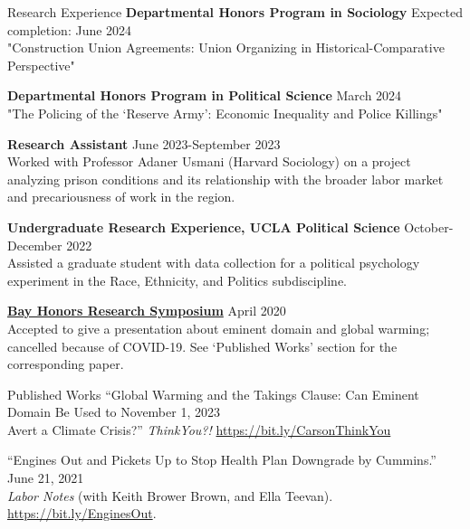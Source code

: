 \documentclass[
	11pt, %
]{resume} %
\begin{document}
\begin{samepage}
\begin{rSection}{Research Experience}
\textbf{Departmental Honors Program in Sociology} \hfill Expected completion: June 2024\\
"Construction Union Agreements: Union Organizing in Historical-Comparative Perspective"

\textbf{Departmental Honors Program in Political Science} \hfill March 2024\\
"The Policing of the `Reserve Army': Economic Inequality and Police Killings"

\textbf{Research Assistant} \hfill June 2023-September 2023\\
Worked with Professor Adaner Usmani (Harvard Sociology) on a project analyzing prison conditions and its
relationship with the broader labor market and precariousness of work in the region.

\textbf{Undergraduate Research Experience, UCLA Political Science} \hfill October-December 2022\\
Assisted a graduate student with data collection for a political psychology experiment in the Race, Ethnicity, and Politics subdiscipline.

\href{https://bayhonors.org/}{\textbf{Bay Honors Research Symposium}} \hfill April 2020\\
Accepted to give a presentation about eminent domain and global warming; cancelled because
of COVID-19. See ‘Published Works’ section for the corresponding paper.

\end{rSection}
\end{samepage}
\begin{samepage}
\begin{rSection}{Published Works}
“Global Warming and the Takings Clause: Can Eminent Domain Be Used to \hfill November 1, 2023 \\
Avert a Climate Crisis?” \textit{ThinkYou?!} \href{https://bit.ly/carson_think_you}{https://bit.ly/CarsonThinkYou}

“Engines Out and Pickets Up to Stop Health Plan Downgrade by Cummins.” \hfill June 21, 2021 \\
\textit{Labor Notes} (with Keith Brower Brown, and Ella Teevan). \href{https://bit.ly/engines_out}{https://bit.ly/EnginesOut}.

\end{rSection}
\end{samepage}
\end{document}
